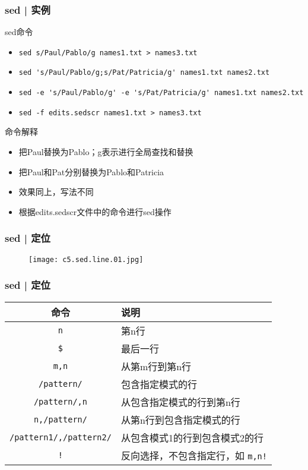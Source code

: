 \begin{frame}[fragile]
  \frametitle{sed | \alert{实例}}
  \begin{block}{sed命令}
    \begin{itemize}
      \item<2-> \verb|sed s/Paul/Pablo/g names1.txt > names3.txt|
      \item<4-> \verb|sed 's/Paul/Pablo/g;s/Pat/Patricia/g' names1.txt names2.txt|
      \item<6-> \verb|sed -e 's/Paul/Pablo/g' -e 's/Pat/Patricia/g' names1.txt names2.txt|
      \item<8-> \verb|sed -f edits.sedscr names1.txt > names3.txt|
    \end{itemize}
  \end{block}
  \begin{block}{命令解释}
    \begin{itemize}
      \item<3-> 把Paul替换为Pablo；g表示进行全局查找和替换
      \item<5-> 把Paul和Pat分别替换为Pablo和Patricia
      \item<7-> 效果同上，写法不同
      \item<9-> 根据edits.sedscr文件中的命令进行sed操作
    \end{itemize}
  \end{block}
\end{frame}

\begin{frame}
  \frametitle{sed | 定位}
  \begin{figure}
    \centering
    \texttt{[image: c5.sed.line.01.jpg]}
  \end{figure}
\end{frame}

\begin{frame}[fragile]
  \frametitle{sed | \alert{定位}}
  \begin{table}
    \centering
    \begin{tabularx}{\textwidth}{cX}
      \hline
      \rowcolor{blue!50}命令 & 说明\\
      \hline
      \verb|n| & 第n行\\
      \verb|$| & 最后一行\\
      \verb|m,n| & 从第m行到第n行\\
      \verb|/pattern/| & 包含指定模式的行\\
      \verb|/pattern/,n| & 从包含指定模式的行到第n行\\
      \verb|n,/pattern/| & 从第n行到包含指定模式的行\\
      \verb|/pattern1/,/pattern2/| & 从包含模式1的行到包含模式2的行\\
      \verb|!| & 反向选择，不包含指定行，如 \verb|m,n!|\\
      \hline
    \end{tabularx}
  \end{table}
\end{frame}

